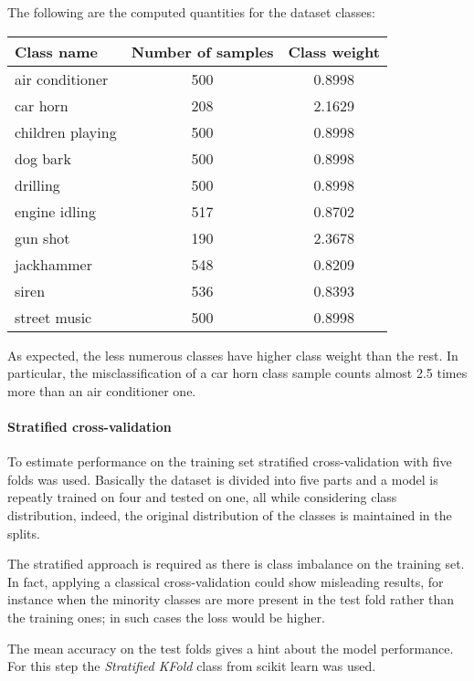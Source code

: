 The following are the computed quantities for the dataset classes:
\begin{center}
    \begin{tabular}{ |l|c|c| } 
        \hline
        Class name & Number of samples & Class weight \\
        \hline
        air conditioner & 500 & 0.8998 \\
        car horn & 208 & 2.1629 \\
        children playing & 500 & 0.8998 \\
        dog bark & 500 & 0.8998 \\
        drilling & 500 & 0.8998 \\
        engine idling & 517 & 0.8702 \\
        gun shot & 190 & 2.3678 \\
        jackhammer & 548 & 0.8209 \\
        siren & 536 & 0.8393 \\
        street music & 500 & 0.8998 \\
        \hline
    \end{tabular}
\end{center}
As expected, the less numerous classes have higher class weight than the rest. 
In particular, the misclassification of a car horn class sample
counts almost 2.5 times more than an air conditioner one.

\paragraph{Stratified cross-validation}
To estimate performance on the training set stratified cross-validation with 
five folds was used. Basically the dataset is divided into five parts 
and a model is repeatly trained on four and tested on one, all while considering class 
distribution, indeed, the original distribution of the classes is maintained 
in the splits.~\cite{stratified}

The stratified approach is required as there is class imbalance on the training set.
In fact, applying a classical cross-validation could show misleading results, 
for instance when the minority classes are more present 
in the test fold rather than the training ones; in such cases the loss would be 
higher.

The mean accuracy on the test folds gives a hint about the model performance.
For this step the \emph{Stratified KFold} class from scikit learn was used.~\cite{cross-scikit}


